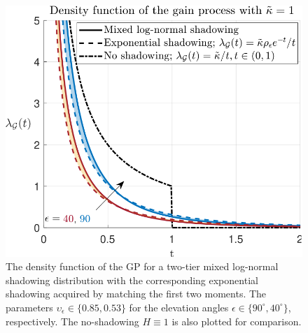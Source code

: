 \documentclass[lettersize,journal]{IEEEtran}
\begin{document}
         \begin{figure}[h]
           \centering
           \includegraphics[width=\linewidth]{plotdensities.pdf}
           \caption{The density function of the GP for a two-tier mixed log-normal shadowing distribution with the corresponding exponential shadowing acquired by matching the first two moments. The parameters $\upsilon_{\epsilon} \in \{0.85,0.53\}$ for the elevation angles $\epsilon \in \{90^{\circ},40^{\circ}\}$, respectively. The no-shadowing $H\equiv 1$ is also plotted for comparison.} 
           \label{fig:plotdensities}
         \end{figure}

\end{document}
